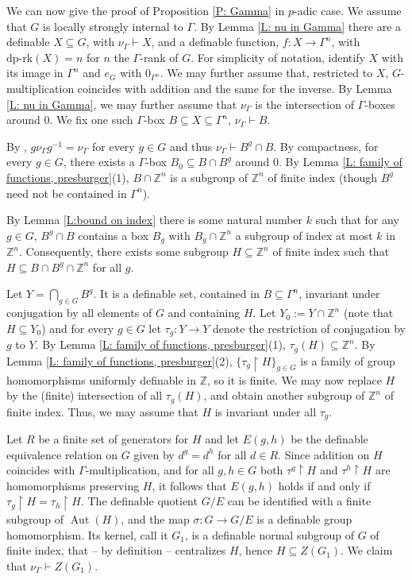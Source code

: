 \documentclass[11pt]{amsart}
\DeclareMathOperator{\aut}{Aut} \DeclareMathOperator{\id}{Id}
\theoremstyle{definition}
\newcommand{\Zz}{{\mathbb {Z}}}
\newcommand{\0}{\emptyset}
\def\dpr{\mathrm{dp\text{-}rk}}
\def\sub{\subseteq}
\begin{document}
We can now give the proof of Proposition \ref{P: Gamma} in $p$-adic case. 
We assume that $G$ is locally strongly internal to $\Gamma$. By Lemma \ref{L: nu in Gamma} there are a definable  $X\subseteq G$, with $\nu_{\Gamma}\vdash X$, and a definable function, $f:X\to \Gamma^n$, with $\dpr(X)=n$ for $n$ the $\Gamma$-rank of $G$. For simplicity of notation, identify $X$ with its image in $\Gamma^n$ and $e_G$ with $0_{\Gamma^n}$. We may further assume that, restricted to $X$, $G$-multiplication coincides with addition and the same for the inverse.
By Lemma  \ref{L: nu in Gamma}, we may further assume that $\nu_{\Gamma}$ is the intersection of  $\Gamma$-boxes around $0$. We fix one such $\Gamma$-box $B\subseteq X\subseteq \Gamma^n$, $\nu_\Gamma\vdash B$. 
   
   By \cite[Proposition 5.8]{HaHaPeGps}, $g\nu_{\Gamma} g^{-1}=\nu_{\Gamma} $ for every $g\in G$ and thus $\nu_{\Gamma}\vdash B^g\cap B$. By compactness, for every $g\in G$, there exists a  $\Gamma$-box $B_0\subseteq B\cap B^g$ around $0$. By Lemma \ref{L: family of functions, presburger}(1),   $B\cap \mathbb{Z}^n$ is a subgroup of $\mathbb{Z}^n$ of finite index (though $B^g$ need not be  contained in $\Gamma^n$).
    
    By Lemma \ref{L:bound on index} there is some natural number $k$ such that for any $g\in G$, $B^g\cap B$ contains a box $B_g$ with $B_g\cap \mathbb{Z}^n$ a subgroup of index at most $k$ in $\Zz^n$. Consequently, there exists some subgroup $H\subseteq \mathbb{Z}^n$ of finite index such that $H\subseteq B\cap B^g\cap \mathbb{Z}^n$ for all $g$.
    
    
    Let $Y=\bigcap\limits_{g\in G}B^g$. It is a definable set, contained in $B\subseteq \Gamma^n$, invariant under conjugation by all elements of $G$ and containing $H$.
     Let $Y_0:=Y\cap \mathbb{Z}^n$  (note that $H\subseteq Y_0$) and for every $g\in G$ let $\tau_g:Y\to Y$  denote the restriction of conjugation by $g$ to $Y$. By Lemma \ref{L: family of functions, presburger}(1), $\tau_g(H)\subseteq \mathbb{Z}^n$. By Lemma \ref{L: family of functions, presburger}(2), $\{\tau_g\restriction H\}_{g\in G}$ is a  family of group homomorphisms uniformly definable in $\mathbb{Z}$, so it is finite. We may now replace $H$ by the (finite) intersection of all $\tau_g(H)$, and obtain another subgroup of $\Zz^n$ of finite index. Thus, we may assume that $H$ is invariant under all $\tau_g$.

    
    Let $R$ be a finite set of generators for $H$ and let $E(g,h)$ be the definable equivalence relation on $G$ given by $d^g=d^h$ for all $d\in R$. Since addition on $H$ coincides with $\Gamma$-multiplication, and  for all $g,h\in G$ both $\tau^g\restriction H$  and $\tau^h\restriction H$  are homomorphisms preserving $H$, it follows that  $E(g,h)$ holds if and only if $\tau_g\restriction H=\tau_h\restriction H$. The  definable quotient $G/E$ can be identified with a finite subgroup of $\aut(H)$, and the map $\sigma:G \to G/E$ is a definable group homomorphism. Its kernel, call it $G_1$, is a definable normal subgroup of $G$ of finite index, that --  by definition -- centralizes $H$, hence $H\sub Z(G_1)$. We claim that $\nu_{\Gamma}\vdash Z(G_1)$.
    
\end{document}
